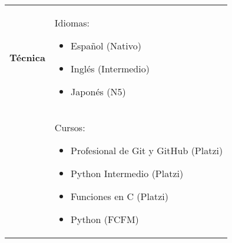 \documentclass[twoside,letter,openright,10pt]{report}
\begin{document}
\begin{table}[hbt!]
\begin{tabular}{p{40mm}p{140mm}}
\textbf{Técnica}
& Idiomas:
\begin{itemize}[noitemsep,nolistsep]
\item Español (Nativo)
\item Inglés (Intermedio)
\item Japonés (N5)
\vspace{-4mm}
\end{itemize}
\\
& Cursos:
\begin{itemize}[noitemsep,nolistsep]
\item Profesional de Git y GitHub (Platzi)
\item Python Intermedio (Platzi)
\item Funciones en C (Platzi)
\item Python (FCFM)
\vspace{-4mm}
\end{itemize}
\end{tabular}
\end{table}
\end{document}
